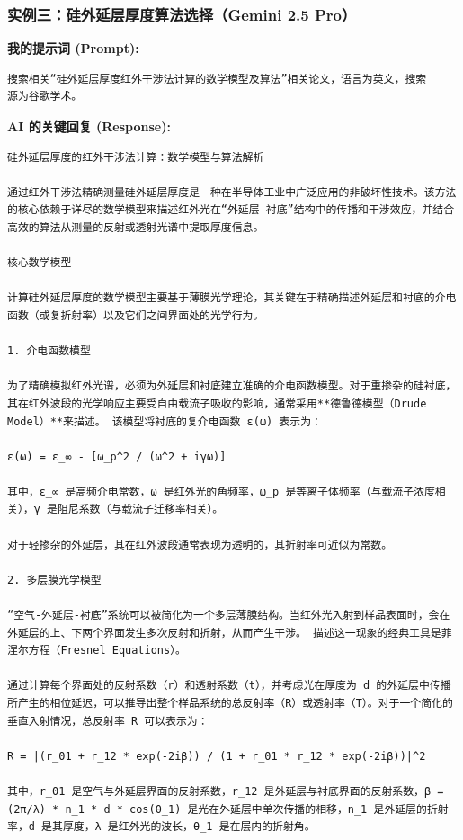 \documentclass[a4paper]{ctexart}
\begin{document}
\subsubsection{实例三：硅外延层厚度算法选择（Gemini 2.5 Pro）}
\noindent\textbf{我的提示词 (Prompt):}
\begin{verbatim}
搜索相关“硅外延层厚度红外干涉法计算的数学模型及算法”相关论文，语言为英文，搜索
源为谷歌学术。
\end{verbatim}
\noindent\textbf{AI 的关键回复 (Response):}
\begin{lstlisting}
硅外延层厚度的红外干涉法计算：数学模型与算法解析

通过红外干涉法精确测量硅外延层厚度是一种在半导体工业中广泛应用的非破坏性技术。该方法的核心依赖于详尽的数学模型来描述红外光在“外延层-衬底”结构中的传播和干涉效应，并结合高效的算法从测量的反射或透射光谱中提取厚度信息。

核心数学模型

计算硅外延层厚度的数学模型主要基于薄膜光学理论，其关键在于精确描述外延层和衬底的介电函数（或复折射率）以及它们之间界面处的光学行为。

1. 介电函数模型

为了精确模拟红外光谱，必须为外延层和衬底建立准确的介电函数模型。对于重掺杂的硅衬底，其在红外波段的光学响应主要受自由载流子吸收的影响，通常采用**德鲁德模型（Drude Model）**来描述。 该模型将衬底的复介电函数 ε(ω) 表示为：

ε(ω) = ε_∞ - [ω_p^2 / (ω^2 + iγω)]

其中，ε_∞ 是高频介电常数，ω 是红外光的角频率，ω_p 是等离子体频率（与载流子浓度相关），γ 是阻尼系数（与载流子迁移率相关）。

对于轻掺杂的外延层，其在红外波段通常表现为透明的，其折射率可近似为常数。

2. 多层膜光学模型

“空气-外延层-衬底”系统可以被简化为一个多层薄膜结构。当红外光入射到样品表面时，会在外延层的上、下两个界面发生多次反射和折射，从而产生干涉。 描述这一现象的经典工具是菲涅尔方程（Fresnel Equations）。

通过计算每个界面处的反射系数（r）和透射系数（t），并考虑光在厚度为 d 的外延层中传播所产生的相位延迟，可以推导出整个样品系统的总反射率（R）或透射率（T）。对于一个简化的垂直入射情况，总反射率 R 可以表示为：

R = |(r_01 + r_12 * exp(-2iβ)) / (1 + r_01 * r_12 * exp(-2iβ))|^2

其中，r_01 是空气与外延层界面的反射系数，r_12 是外延层与衬底界面的反射系数，β = (2π/λ) * n_1 * d * cos(θ_1) 是光在外延层中单次传播的相移，n_1 是外延层的折射率，d 是其厚度，λ 是红外光的波长，θ_1 是在层内的折射角。


\end{lstlisting}
\end{document}

